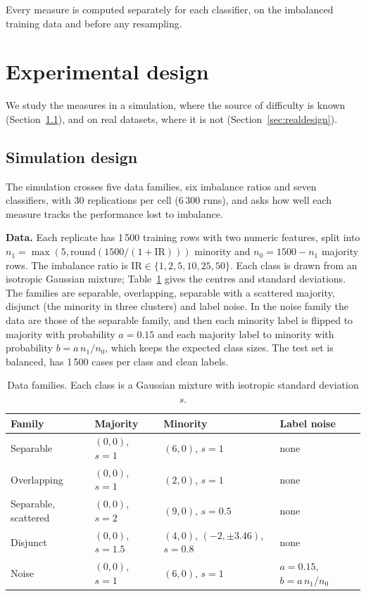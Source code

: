 \documentclass[preprint,12pt]{elsarticle}
\newcommand{\IR}{\mathrm{IR}}
\begin{document}
Every measure is computed separately for each classifier, on the imbalanced training data and before any resampling.


\section{Experimental design}\label{sec:design}
We study the measures in a simulation, where the source of difficulty is known (Section~\ref{sec:simdesign}), and on real datasets, where it is not (Section~\ref{sec:realdesign}).

\subsection{Simulation design}\label{sec:simdesign}
The simulation crosses five data families, six imbalance ratios and seven classifiers, with 30 replications per cell (6\,300 runs), and asks how well each measure tracks the performance lost to imbalance.

\textbf{Data.} Each replicate has 1\,500 training rows with two numeric features, split into $n_1=\max(5,\mathrm{round}(1500/(1+\IR)))$ minority and $n_0=1500-n_1$ majority rows. The imbalance ratio is $\IR\in\{1,2,5,10,25,50\}$. Each class is drawn from an isotropic Gaussian mixture; Table~\ref{tab:gen} gives the centres and standard deviations. The families are separable, overlapping, separable with a scattered majority, disjunct (the minority in three clusters) and label noise. In the noise family the data are those of the separable family, and then each minority label is flipped to majority with probability $a=0.15$ and each majority label to minority with probability $b=a\,n_1/n_0$, which keeps the expected class sizes. The test set is balanced, has 1\,500 cases per class and clean labels.

\begin{table}[H]
\centering
\caption{Data families. Each class is a Gaussian mixture with isotropic standard deviation $s$.}\label{tab:gen}
\footnotesize\setlength{\tabcolsep}{3pt}
\begin{tabular}{llll}
\toprule
Family & Majority & Minority & Label noise \\
\midrule
Separable & $(0,0)$, $s=1$ & $(6,0)$, $s=1$ & none \\
Overlapping & $(0,0)$, $s=1$ & $(2,0)$, $s=1$ & none \\
Separable, scattered & $(0,0)$, $s=2$ & $(9,0)$, $s=0.5$ & none \\
Disjunct & $(0,0)$, $s=1.5$ & $(4,0)$, $(-2,\pm 3.46)$, $s=0.8$ & none \\
Noise & $(0,0)$, $s=1$ & $(6,0)$, $s=1$ & $a=0.15$, $b=a\,n_1/n_0$ \\
\bottomrule
\end{tabular}
\end{table}
\end{document}
